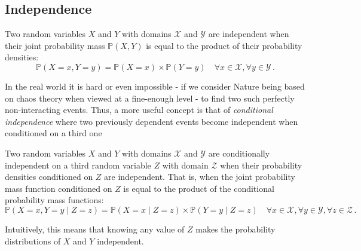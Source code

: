 \subsection{Independence} \label{subsec:independence}
\begin{definition}
	Two random variables $X$ and $Y$ with domains $\mathcal{X}$ and $\mathcal{Y}$ are independent when their joint probability mass $\mathbb{P}(X,Y)$ is equal to the product of their probability densities:
	\begin{equation*}
		\mathbb{P}(X=x,Y=y) =  \mathbb{P}(X=x) \times \mathbb{P}(Y=y) \quad \forall x \in \mathcal{X}, \forall y \in \mathcal{Y} \,.
	\end{equation*}
\end{definition}
In the real world it is hard or even impossible - if we consider Nature being based on chaos theory when viewed at a fine-enough level - to find two such perfectly non-interacting events.
Thus, a more useful concept is that of \textit{conditional independence} where two previously dependent events become independent when conditioned on a third one

\begin{definition}
	Two random variables $X$ and $Y$ with domains $\mathcal{X}$ and $\mathcal{Y}$ are conditionally independent on a third random variable $Z$ with domain $\mathcal{Z}$ when their probability densities conditioned on $Z$ are independent.
	That is, when the joint probability mass function conditioned on $Z$ is equal to the product of the conditional probability mass functions:
	\begin{equation*}
		\mathbb{P}(X=x,Y=y \mid Z=z) = \mathbb{P}(X=x \mid Z=z) \times \mathbb{P}(Y=y \mid Z=z) \quad \forall x \in \mathcal{X}, \forall y \in \mathcal{Y}, \forall z \in \mathcal{Z} \,.
	\end{equation*}
\end{definition}
Intuitively, this means that knowing any value of $Z$ makes the probability distributions of $X$ and $Y$ independent.